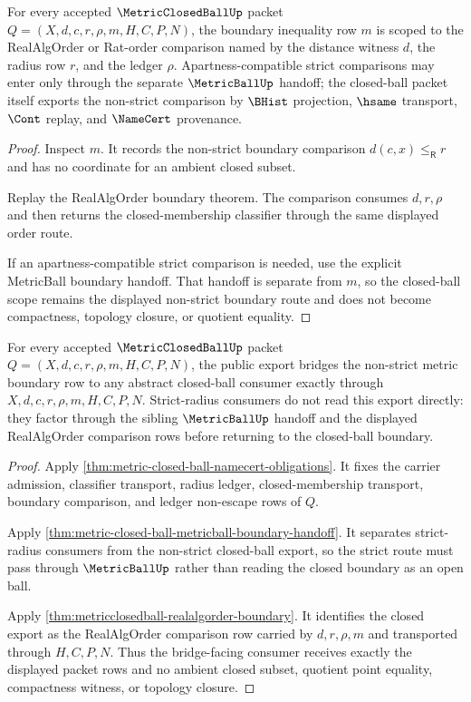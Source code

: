 \begin{theorem}
\label{thm:metric-closed-ball-realalgorder-boundary-scope}
For every accepted $\MetricClosedBallUp$ packet $Q=(X,d,c,r,\rho,m,H,C,P,N)$, the boundary inequality row $m$ is scoped to the RealAlgOrder or Rat-order comparison named by the distance witness $d$, the radius row $r$, and the ledger $\rho$. Apartness-compatible strict comparisons may enter only through the separate $\MetricBallUp$ handoff; the closed-ball packet itself exports the non-strict comparison by $\BHist$ projection, $\hsame$ transport, $\Cont$ replay, and $\NameCert$ provenance.
\end{theorem}
\begin{proof}
Inspect $m$. It records the non-strict boundary comparison $d(c,x)\leq_{\mathsf R}r$ and has no coordinate for an ambient closed subset.

Replay the RealAlgOrder boundary theorem. The comparison consumes $d,r,\rho$ and then returns the closed-membership classifier through the same displayed order route.

If an apartness-compatible strict comparison is needed, use the explicit MetricBall boundary handoff. That handoff is separate from $m$, so the closed-ball scope remains the displayed non-strict boundary route and does not become compactness, topology closure, or quotient equality.
\end{proof}

\begin{theorem}
\label{thm:metric-closed-ball-bridged-export}
For every accepted $\MetricClosedBallUp$ packet $Q=(X,d,c,r,\rho,m,H,C,P,N)$, the public export bridges the non-strict metric boundary row to any abstract closed-ball consumer exactly through $X,d,c,r,\rho,m,H,C,P,N$. Strict-radius consumers do not read this export directly: they factor through the sibling $\MetricBallUp$ handoff and the displayed RealAlgOrder comparison rows before returning to the closed-ball boundary.
\end{theorem}
\begin{proof}
Apply \autoref{thm:metric-closed-ball-namecert-obligations}. It fixes the carrier admission, classifier transport, radius ledger, closed-membership transport, boundary comparison, and ledger non-escape rows of $Q$.

Apply \autoref{thm:metric-closed-ball-metricball-boundary-handoff}. It separates strict-radius consumers from the non-strict closed-ball export, so the strict route must pass through $\MetricBallUp$ rather than reading the closed boundary as an open ball.

Apply \autoref{thm:metricclosedball-realalgorder-boundary}. It identifies the closed export as the RealAlgOrder comparison row carried by $d,r,\rho,m$ and transported through $H,C,P,N$. Thus the bridge-facing consumer receives exactly the displayed packet rows and no ambient closed subset, quotient point equality, compactness witness, or topology closure.
\end{proof}

